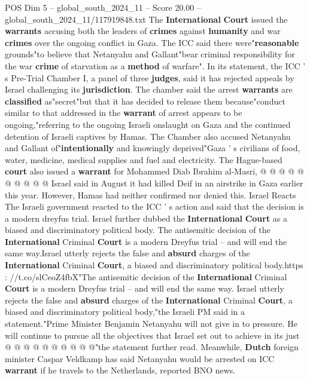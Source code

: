 \begin{textsample}{POS Dim 5 – global\_south\_2024\_11 – Score 20.00 – global\_south\_2024\_11/117919848.txt}  \label{ex:f5_pos_024}
The \textbf{International} \textbf{Court} issued the \textbf{warrants} accusing both the leaders of \textbf{crimes} against \textbf{humanity} and war \textbf{crimes} over the ongoing conflict in Gaza.
The ICC said there were"\textbf{reasonable} grounds"to believe that Netanyahu and Gallant"bear criminal responsibility for the war \textbf{crime} of starvation as a \textbf{method} of warfare".
In its statement, the ICC ' s Pre-Trial Chamber I, a panel of three \textbf{judges}, said it has rejected appeals by Israel challenging its \textbf{jurisdiction}.
The chamber said the arrest \textbf{warrants} are \textbf{classified} as"secret"but that it has decided to release them because"conduct similar to that addressed in the \textbf{warrant} of arrest appears to be ongoing,"referring to the ongoing Israeli onslaught on Gaza and the continued detention of Israeli captives by Hamas.
The Chamber also accused Netanyahu and Gallant of"\textbf{intentionally} and knowingly deprived"Gaza ' s civilians of food, water, medicine, medical supplies and fuel and electricity.
The Hague-based \textbf{court} also issued a \textbf{warrant} for Mohammed Diab Ibrahim al-Masri, @ @ @ @ @ @ @ @ @ @ Israel said in August it had killed Deif in an airstrike in Gaza earlier this year.
However, Hamas had neither confirmed nor denied this.
Israel Reacts The Israeli government reacted to the ICC ' s action and said that the decision is a modern dreyfus trial.
Israel further dubbed the \textbf{International} \textbf{Court} as a biased and discriminatory political body.
The antisemitic decision of the \textbf{International} Criminal \textbf{Court} is a modern Dreyfus trial -- and will end the same way.Israel utterly rejects the false and \textbf{absurd} charges of the \textbf{International} Criminal \textbf{Court}, a biased and discriminatory political body.https : //t.co/slCeoZ4fbX"The antisemitic decision of the \textbf{International} Criminal \textbf{Court} is a modern Dreyfus trial -- and will end the same way.
Israel utterly rejects the false and \textbf{absurd} charges of the \textbf{International} Criminal \textbf{Court}, a biased and discriminatory political body,"the Israeli PM said in a statement."Prime Minister Benjamin Netanyahu will not give in to pressure.
He will continue to pursue all the objectives that Israel set out to achieve in its just @ @ @ @ @ @ @ @ @ @"the statement further read.
Meanwhile, \textbf{Dutch} foreign minister Caspar Veldkamp has said Netanyahu would be arrested on ICC \textbf{warrant} if he travels to the Netherlands, reported BNO news.

\end{textsample}
